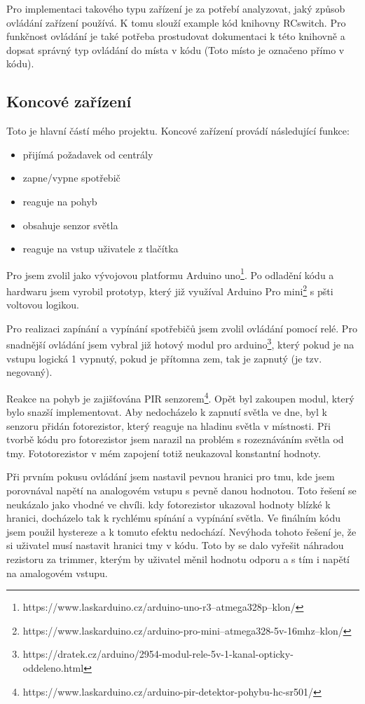 \documentclass[11pt,a4paper,twoside,openright]{report}
\begin{document}
Pro implementaci takového typu zařízení je za potřebí analyzovat, jaký způsob ovládání zařízení používá. K tomu slouží example kód knihovny RCswitch. Pro funkčnost ovládání je také potřeba prostudovat dokumentaci k této knihovně a dopsat správný typ ovládání do místa v kódu (Toto místo je označeno přímo v kódu).

\subsection{Koncové zařízení}

Toto je hlavní částí mého projektu. Koncové zařízení provádí následující funkce:

\begin{itemize}
	\item přijímá požadavek od centrály
	\item zapne/vypne spotřebič
	\item reaguje na pohyb
	\item obsahuje senzor světla 
	\item reaguje na vstup uživatele z tlačítka
\end{itemize}

Pro  jsem zvolil jako vývojovou platformu Arduino uno\footnote{https://www.laskarduino.cz/arduino-uno-r3--atmega328p--klon/}. Po odladění kódu a hardwaru jsem vyrobil prototyp, který již využíval Arduino Pro mini\footnote{https://www.laskarduino.cz/arduino-pro-mini--atmega328-5v-16mhz--klon/} s pšti voltovou logikou. 


Pro realizaci zapínání a vypínání spotřebičů jsem zvolil ovládání pomocí relé. Pro snadnější ovládání jsem vybral již hotový modul pro arduino\footnote{https://dratek.cz/arduino/2954-modul-rele-5v-1-kanal-opticky-oddeleno.html}, který pokud je na vstupu logická 1 vypnutý, pokud je přítomna zem, tak je zapnutý (je tzv. negovaný).


Reakce na pohyb je zajišťována PIR senzorem\footnote{https://www.laskarduino.cz/arduino-pir-detektor-pohybu-hc-sr501/}. Opět byl zakoupen modul, který bylo snazší implementovat. Aby nedocházelo k zapnutí světla ve dne, byl k senzoru přidán fotorezistor, který reaguje na hladinu světla v místnosti. Při tvorbě kódu pro fotorezistor jsem narazil na problém s rozeznáváním světla od tmy. Fototorezistor v mém zapojení totiž neukazoval konstantní hodnoty.


Při prvním pokusu ovládání jsem nastavil pevnou hranici pro tmu, kde jsem porovnával napětí na analogovém vstupu s pevně danou hodnotou. Toto řešení se neukázalo jako vhodné ve chvíli. kdy fotorezistor ukazoval hodnoty blízké k hranici, docházelo tak k rychlému spínání a vypínání světla. Ve finálním kódu jsem použil hystereze a k tomuto efektu nedochází. Nevýhoda tohoto řešení je, že si uživatel musí nastavit hranici tmy v kódu. Toto by se dalo vyřešit náhradou rezistoru za trimmer, kterým by uživatel měnil hodnotu odporu a s tím i napětí na amalogovém vstupu.
\end{document}
